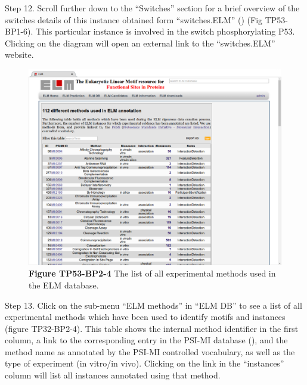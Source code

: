 Step 12. Scroll further down to the ``Switches'' section for a brief
overview of the switches details of this instance obtained form
``switches.ELM'' (\cite{23550212}) (Fig TP53-BP1-6). This particular
instance is involved in the switch phosphorylating P53. Clicking on the
diagram will open an external link to the ``switches.ELM'' website.

\begin{figure}[h!]
\centering
\includegraphics[width=\textwidth]{Figures/TP53_2/methods.png} 
\caption{
\textbf{Figure TP53-BP2-4}
The list of all experimental methods used in the ELM
database.
}
\end{figure}

Step 13. Click on the sub-menu ``ELM methods'' in ``ELM DB'' to see a
list of all experimental methods which have been used to identify motifs
and instances (figure TP32-BP2-4). This table shows the internal method
identifier in the first column, a link to the corresponding entry in the
PSI-MI database (\cite{17925023}), and the method name as annotated by
the PSI-MI controlled vocabulary, as well as the type of experiment (in
vitro/in vivo). Clicking on the link in the ``instances'' column will
list all instances annotated using that method.


